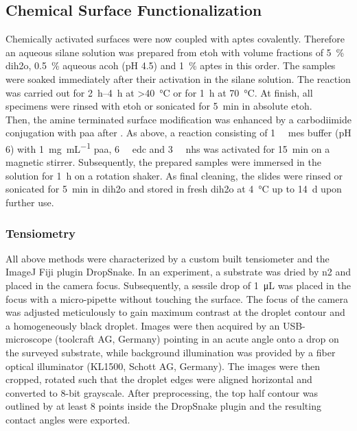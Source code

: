 \subsection{Chemical Surface Functionalization}
\label{sec:meth:surfFunc}
Chemically activated surfaces were now coupled with \gls{aptes} covalently. Therefore an aqueous silane solution was prepared from \gls{etoh} with volume fractions of \SI{5}{\percent} \gls{dih2o}, \SI{0.5}{\percent} aqueous \gls{acoh} (pH 4.5) and \SI{1}{\percent} \gls{aptes} in this order. The samples were soaked immediately after their activation in the silane solution. The reaction was carried out for \SIrange{2}{4}{\hour} at \SI{>40}{\degreeCelsius} or for \SI{1}{\hour} at \SI{70}{\degreeCelsius}. At finish, all specimens were rinsed with \gls{etoh} or sonicated for \SI{5}{\minute} in absolute \gls{etoh}.\\
Then, the amine terminated surface modification was enhanced by a carbodiimide conjugation with \gls{paa} after \citet{lit:Anti-EpCAM-PAA}. As above, a reaction consisting of \SI{1}{\milli\molar} \gls{mes} buffer (pH 6) with \SI{1}{\milli\gram\per\milli\liter} \gls{paa}, \SI{6}{\milli\molar} \gls{edc} and  \SI{3}{\milli\molar} \gls{nhs} was activated for \SI{15}{\minute} on a magnetic stirrer. Subsequently, the prepared samples were immersed in the solution for \SI{1}{\hour} on a rotation shaker. As final cleaning, the slides were rinsed or sonicated for \SI{5}{\minute} in \gls{dih2o} and stored in fresh \gls{dih2o} at \SI{4}{\degreeCelsius} up to \SI{14}{\day} upon further use.
\subsubsection{Tensiometry}
All above methods were characterized by a custom built tensiometer and the ImageJ Fiji plugin DropSnake. \cite{lit:chem:Fiji,lit:chem:surfaceTension}
In an experiment, a substrate was dried by \gls{n2} and placed in the camera focus. Subsequently, a sessile drop of \SI{1}{\micro\liter} was placed in the focus with a micro-pipette without touching the surface. The focus of the camera was adjusted meticulously to gain maximum contrast at the droplet contour and a homogeneously black droplet. Images were then acquired by an USB-microscope (toolcraft AG, Germany)
pointing in an acute angle onto a drop on the surveyed substrate, while background illumination was provided by a fiber optical illuminator (KL1500, Schott AG, Germany). The images were then cropped, rotated such that the droplet edges were aligned horizontal and converted to 8-bit grayscale. After preprocessing, the top half contour was outlined by at least 8 points inside the DropSnake plugin and the resulting contact angles were exported.
